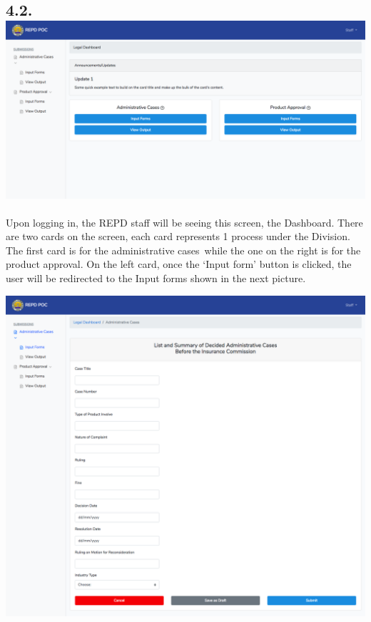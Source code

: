 \documentclass{article}
\begin{document}
\subsection{4.2.\hspace*{0.5em}\includegraphics[keepaspectratio=true]{up-ic-screens/image81}{}}\label{sec-up-ic-screensimage81png}%

\noindent{}Upon logging in, the REPD staff will be seeing this
screen, the Dashboard. There are two cards on the screen, each card
represents 1 process under the Division. The first card is for the
administrative cases while the one on the right is for the product approval. On the left card,
once the ‘Input form’ button is clicked, the user will be redirected to
the Input forms shown in the next picture.%

\includegraphics[keepaspectratio=true]{up-ic-screens/image205}{}%
\end{document}
